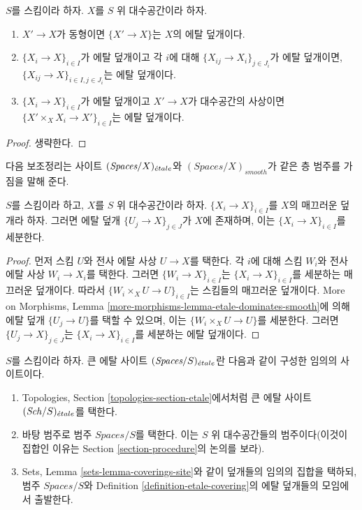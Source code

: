 \begin{lemma}
\label{lemma-etale}
$S$를 스킴이라 하자. $X$를 $S$ 위 대수공간이라 하자.
\begin{enumerate}
\item $X' \to X$가 동형이면 $\{X' \to X\}$는 $X$의 에탈 덮개이다.
\item $\{X_i \to X\}_{i\in I}$가 에탈 덮개이고 각 $i$에 대해
$\{X_{ij} \to X_i\}_{j\in J_i}$가 에탈 덮개이면,
$\{X_{ij} \to X\}_{i \in I, j\in J_i}$는 에탈 덮개이다.
\item $\{X_i \to X\}_{i\in I}$가 에탈 덮개이고 $X' \to X$가
대수공간의 사상이면
$\{X' \times_X X_i \to X'\}_{i\in I}$는 에탈 덮개이다.
\end{enumerate}
\end{lemma}

\begin{proof}
생략한다.
\end{proof}

\noindent
다음 보조정리는 사이트 $(\textit{Spaces}/X)_{\acute{e}tale}$와
$(\textit{Spaces}/X)_{smooth}$가 같은 층 범주를 가짐을 말해 준다.

\begin{lemma}
\label{lemma-etale-dominates-smooth}
$S$를 스킴이라 하고, $X$를 $S$ 위 대수공간이라 하자.
$\{X_i \to X\}_{i \in I}$를 $X$의 매끄러운 덮개라 하자. 그러면 에탈
덮개 $\{U_j \to X\}_{j \in J}$가 $X$에 존재하며, 이는
$\{X_i \to X\}_{i \in I}$를 세분한다.
\end{lemma}

\begin{proof}
먼저 스킴 $U$와 전사 에탈 사상 $U \to X$를 택한다. 각 $i$에 대해 스킴
$W_i$와 전사 에탈 사상 $W_i \to X_i$를 택한다. 그러면
$\{W_i \to X\}_{i \in I}$는 $\{X_i \to X\}_{i \in I}$를 세분하는
매끄러운 덮개이다. 따라서
$\{W_i \times_X U \to U\}_{i \in I}$는 스킴들의 매끄러운 덮개이다.
More on Morphisms, Lemma \ref{more-morphisms-lemma-etale-dominates-smooth}에
의해 에탈 덮개 $\{U_j \to U\}$를 택할 수 있으며, 이는
$\{W_i \times_X U \to U\}$를 세분한다. 그러면 $\{U_j \to X\}_{j \in J}$는
$\{X_i \to X\}_{i \in I}$를 세분하는 에탈 덮개이다.
\end{proof}
\begin{definition}
\label{definition-big-etale-site}
$S$를 스킴이라 하자. 큰 에탈 사이트 {\it $(\textit{Spaces}/S)_{\acute{e}tale}$}란
다음과 같이 구성한 임의의 사이트이다.
\begin{enumerate}
\item Topologies, Section \ref{topologies-section-etale}에서처럼 큰 에탈
사이트 $(\mathit{Sch}/S)_{\acute{e}tale}$를 택한다.
\item 바탕 범주로 범주 $\textit{Spaces}/S$를 택한다. 이는 $S$ 위
대수공간들의 범주이다(이것이 집합인 이유는 Section
\ref{section-procedure}의 논의를 보라).
\item Sets, Lemma \ref{sets-lemma-coverings-site}와 같이 덮개들의 임의의
집합을 택하되, 범주 $\textit{Spaces}/S$와 Definition
\ref{definition-etale-covering}의 에탈 덮개들의 모임에서 출발한다.
\end{enumerate}
\end{definition}

